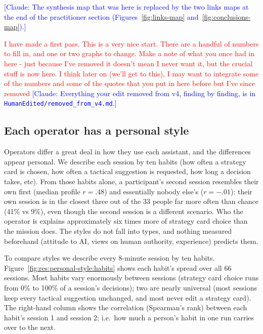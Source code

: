 
\textcolor{blue}{[Claude: The synthesis map that was here is replaced by the two links maps at the end of the practitioner section (Figures~\ref{fig:links-map} and~\ref{fig:conclusions-map}).]}


\textcolor{red}{I have made a first pass. This is a very nice start. There are a handful of numbers to fill in, and one or two graphs to change. Make a note of what you once had in here - just because I've removed it doesn't mean I never want it, but the crucial stuff is now here. I think later on (we'll get to this), I may want to integrate some of the numbers and some of the quotes that you put in here before but I've since removed}
\textcolor{blue}{[Claude: Everything your edit removed from v4, finding by finding, is in \texttt{HumanEdited/removed\_from\_v4.md}.]}

\subsection{Each operator has a personal style}\label{sec:res:personal-style}

Operators differ a great deal in how they use each assistant, and the differences appear personal. We describe each session by ten habits (how often a strategy card is chosen, how often a tactical suggestion is requested, how long a decision takes, etc). From those habits alone, a participant's second session resembles their own first (median profile $r = .48$) and essentially nobody else's ($r = -.01$): their own session is in the closest three out of the 33 people far more often than chance (41\% vs 9\%), even though the second session is a different scenario. Who the operator is explains approximately six times more of strategy card choice than the mission does. The styles do not fall into types, and nothing measured beforehand (attitude to AI, views on human authority, experience) predicts them.


\label{sec:res:personal-style:habits}
To compare styles we describe every 8-minute session by ten habits. Figure~\ref{fig:res:personal-style:habits} shows each habit's spread over all 66 sessions. Most habits vary enormously between sessions (strategy card choice runs from 0\% to 100\% of a session's decisions); two are nearly universal (most sessions keep every tactical suggestion unchanged, and most never edit a strategy card). The right-hand column shows the correlation (Spearman's rank) between each habit's session 1 and session 2; i.e.\ how much a person's habit in one run carries over to the next.


